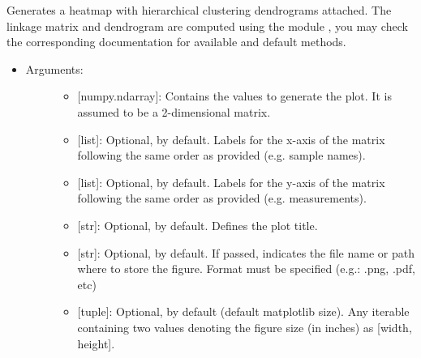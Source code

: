\documentclass[letterpaper,10pt,english]{sphinxmanual}
\begin{document}

\begin{fulllineitems}
\label{\detokenize{plots:data_tools.plots.cluster_hmap}}
Generates a heatmap with hierarchical clustering dendrograms
attached. The linkage matrix and dendrogram are computed using the
module , you may check the
corresponding documentation for available and default methods.
\begin{itemize}
\item {} \begin{description}
\item[{Arguments:}] \leavevmode\begin{itemize}
\item {} 
 {[}numpy.ndarray{]}: Contains the values to generate the
plot. It is assumed to be a 2-dimensional matrix.

\item {} 
 {[}list{]}: Optional,  by default. Labels for
the x-axis of the matrix following the same order as provided
(e.g. sample names).

\item {} 
 {[}list{]}: Optional,  by default. Labels for
the y-axis of the matrix following the same order as provided
(e.g. measurements).

\item {} 
 {[}str{]}: Optional,  by default. Defines the plot
title.

\item {} 
 {[}str{]}: Optional,  by default. If passed,
indicates the file name or path where to store the figure.
Format must be specified (e.g.: .png, .pdf, etc)

\item {} 
 {[}tuple{]}: Optional,  by default (default
matplotlib size). Any iterable containing two values denoting
the figure size (in inches) as {[}width, height{]}.


\end{itemize}
\end{description}
\end{itemize}
\end{fulllineitems}
\end{document}
